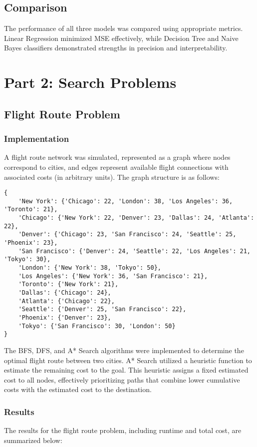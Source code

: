 \documentclass[12pt]{article}
\begin{document}
\subsection{Comparison}
The performance of all three models was compared using appropriate metrics. Linear Regression minimized MSE effectively, while Decision Tree and Naive Bayes classifiers demonstrated strengths in precision and interpretability.

\section{Part 2: Search Problems}
\subsection{Flight Route Problem}
\subsubsection{Implementation}
A flight route network was simulated, represented as a graph where nodes correspond to cities, and edges represent available flight connections with associated costs (in arbitrary units). The graph structure is as follows:

\begin{verbatim}
{
    'New York': {'Chicago': 22, 'London': 38, 'Los Angeles': 36, 'Toronto': 21},
    'Chicago': {'New York': 22, 'Denver': 23, 'Dallas': 24, 'Atlanta': 22},
    'Denver': {'Chicago': 23, 'San Francisco': 24, 'Seattle': 25, 'Phoenix': 23},
    'San Francisco': {'Denver': 24, 'Seattle': 22, 'Los Angeles': 21, 'Tokyo': 30},
    'London': {'New York': 38, 'Tokyo': 50},
    'Los Angeles': {'New York': 36, 'San Francisco': 21},
    'Toronto': {'New York': 21},
    'Dallas': {'Chicago': 24},
    'Atlanta': {'Chicago': 22},
    'Seattle': {'Denver': 25, 'San Francisco': 22},
    'Phoenix': {'Denver': 23},
    'Tokyo': {'San Francisco': 30, 'London': 50}
}
\end{verbatim}

The BFS, DFS, and A* Search algorithms were implemented to determine the optimal flight route between two cities. A* Search utilized a heuristic function to estimate the remaining cost to the goal. This heuristic assigns a fixed estimated cost to all nodes, effectively prioritizing paths that combine lower cumulative costs with the estimated cost to the destination.

\subsubsection{Results}
The results for the flight route problem, including runtime and total cost, are summarized below:
\end{document}
